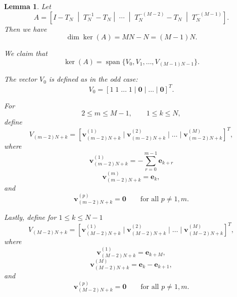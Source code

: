 \documentclass{article}
\newtheorem{lemma}[theorem]{Lemma}
\begin{document}
\begin{lemma}
Let \[A =\left[I - T_N\;\middle|\;T_N^{-1} - T_N\middle|\;\cdots \;\middle|\; T_N^{-(M-2)} - T_N \;\middle|\; T_N^{-(M-1)} \right]. \]
Then we have
\begin{equation}\label{n even dim}
    \dim\ker(A)=MN-N=(M-1)N.
\end{equation}

We claim that
\begin{equation}\label{n even span}
    \ker(A)= \operatorname{span} \{V_0,V_1,\dots,V_{(M-1)N-1}\}.
\end{equation}

The vector $V_0$ is defined as in the odd case:
\[
V_0=
[1\;1\;\dots\;1
\mid
\mathbf{0}
\mid
\dots
\mid
\mathbf{0}]^T.
\]

For
\[
2\leq m\leq M-1,
\qquad
1\leq k\leq N,
\]
define
\[
V_{(m-2)N+k}
=
[
\mathbf{v}_{(m-2)N+k}^{(1)}
\mid
\mathbf{v}_{(m-2)N+k}^{(2)}
\mid
\dots
\mid
\mathbf{v}_{(m-2)N+k}^{(M)}
]^T,
\]
where
\[
\mathbf{v}_{(m-2)N+k}^{(1)}
=-\sum_{r=0}^{m-1} \mathbf{e}_{k+r}
\]
\[
\mathbf{v}_{(m-2)N+k}^{(m)}
=
\mathbf{e}_k,
\]
and
\[
\mathbf{v}_{(m-2)N+k}^{(p)}
=
\mathbf{0}
\qquad
\text{for all }p\neq 1,m.
\]

Lastly, define  for  $1\leq k\leq N-1$
\[
V_{(M-2)N+k}
=
[
\mathbf{v}_{(M-2)N+k}^{(1)}
\mid
\mathbf{v}_{(M-2)N+k}^{(2)}
\mid
\dots
\mid
\mathbf{v}_{(M-2)N+k}^{(M)}
]^T,
\]
where
\[
\mathbf{v}_{(M-2)N+k}^{(1)}
=
\mathbf{e}_{k+M},
\]
\[
\mathbf{v}_{(M-2)N+k}^{(M)}
=
\mathbf{e}_k-\mathbf{e}_{k+1},
\]
and
\[
\mathbf{v}_{(M-2)N+k}^{(p)}
=
\mathbf{0}
\qquad
\text{for all }p\neq 1,m .
\]
\end{lemma}
\end{document}
